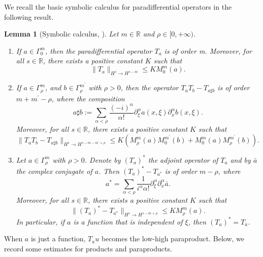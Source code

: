 \documentclass[12pt]{amsart}
\newtheorem{lemma}[theorem]{Lemma}
\theoremstyle{definition}
\numberwithin{equation}{section}
\begin{document}
We recall the basic symbolic calculus for paradifferential operators in the following result.
\begin{lemma}[Symbolic calculus, \cite{MR2418072}]
Let $m\in \mathbb{R}$ and $\rho\in [0, +\infty)$.
\begin{enumerate}
\item If $a\in \Gamma^m_0$, then the paradifferential operator $T_a$ is of order m. Moreover, for all $s\in \mathbb{R}$, there exists a positive constant $K$ such that
\begin{equation}
\|T_a\|_{H^s\rightarrow H^{s-m}} \leq K M^m_0(a). \label{TABound}
\end{equation}
\item If $a\in \Gamma^m_\rho$, and $b\in \Gamma^{m^{'}}_\rho$ with $\rho>0$, then the operator $T_a T_b -T_{a\sharp b}$ is of order $m+m^{'}-\rho$, where the composition
\begin{equation*}
    a \sharp b := \sum_{\alpha<\rho} \frac{(-i)^\alpha}{\alpha !} \partial^\alpha_\xi a(x,\xi) \partial^\alpha_x b(x,\xi).
\end{equation*}
Moreover,  for all $s\in \mathbb{R}$, there exists a positive constant $K$ such that
\begin{equation}
  \|T_a T_b-T_{a\sharp b} \|_{H^s \rightarrow H^{s-m-m^{'}+\rho}} \leq K\left(M^m_\rho(a)M^{m^{'}}_0(b) + M^m_0(a)M^{m^{'}}_\rho(b)\right). \label{CompositionPara}
\end{equation}
\item Let $a\in \Gamma^m_\rho$ with $\rho > 0$. 
Denote by $(T_a)^{*}$ the adjoint operator of $T_a$ and by $\bar{a}$ the complex conjugate of $a$.
Then $(T_a)^{*} -T_{a^{*}}$ is of order $m - \rho$, where 
\begin{equation*}
    a^{*} =  \sum_{\alpha<\rho} \frac{1}{i^\alpha \alpha !} \partial^\alpha_\xi \partial^\alpha_x \bar{a}.
\end{equation*}
Moreover,  for all $s\in \mathbb{R}$, there exists a positive constant $K$ such that
\begin{equation}
 \|(T_a)^{*} -T_{a^{*}} \|_{H^s \rightarrow H^{s-m+\rho}} \leq KM^m_\rho(a). \label{AdjointBound}
\end{equation}
In particular, if $a$ is a function that is independent of $\xi$, then  $(T_a)^* = T_{\bar{a}}$.
\end{enumerate}
\end{lemma}

When $a$ is just a function, $T_a u$ becomes the low-high paraproduct.
Below, we record some estimates for products and paraproducts.
\end{document}
